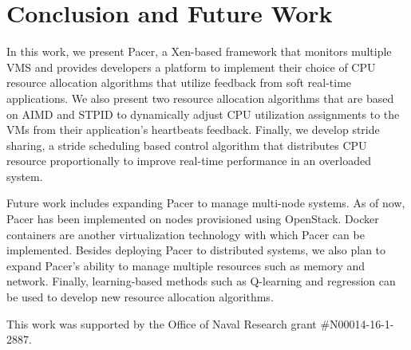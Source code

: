 \section{Conclusion and Future Work}
\label{send}


In this work, we present Pacer, a Xen-based framework that monitors multiple VMS and provides developers a platform to implement their choice of CPU resource allocation algorithms that utilize feedback from soft real-time applications. We also present two resource allocation algorithms that are based on AIMD and STPID to dynamically adjust CPU utilization assignments to the VMs from their application's heartbeats feedback. Finally, we develop stride sharing, a stride scheduling based control algorithm that distributes CPU resource proportionally to improve real-time performance in an overloaded system. 

Future work includes expanding Pacer to manage multi-node systems. As of now, Pacer has been implemented on nodes provisioned using OpenStack\cite{openstack}. Docker containers\cite{docker} are another virtualization technology with which Pacer can be implemented. Besides deploying Pacer to distributed systems, we also plan to expand Pacer's ability to manage multiple resources such as memory and network. Finally, learning-based methods such as Q-learning and regression can be used to develop new resource allocation algorithms.

This work was supported by the Office of Naval Research grant \#N00014-16-1-2887.

